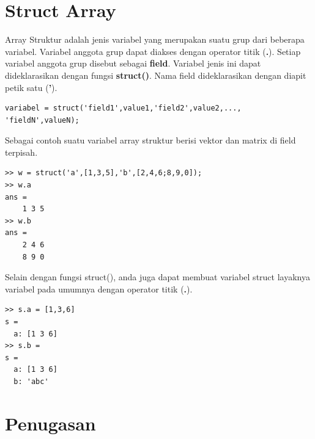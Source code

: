\documentclass[12pt]{book}
\begin{document}
	\section{Struct Array}
	
	Array Struktur adalah jenis variabel yang merupakan suatu grup dari beberapa variabel.
	Variabel anggota grup dapat diakses dengan operator titik (\textbf{.}).
	Setiap variabel anggota grup disebut sebagai \textbf{field}.
	Variabel jenis ini dapat dideklarasikan dengan fungsi \textbf{struct()}.
	Nama field dideklarasikan dengan diapit petik satu (\textbf{'}).
	\begin{verbatim}
variabel = struct('field1',value1,'field2',value2,..., 'fieldN',valueN);
	\end{verbatim}

	Sebagai contoh suatu variabel array struktur berisi vektor dan matrix di field terpisah.
	\begin{verbatim}
>> w = struct('a',[1,3,5],'b',[2,4,6;8,9,0]);
>> w.a
ans =
    1 3 5
>> w.b
ans = 
    2 4 6
    8 9 0
	\end{verbatim}

	\newpage
	Selain dengan fungsi struct(), anda juga dapat membuat variabel struct layaknya variabel pada umumnya dengan operator titik (\textbf{.}).
	\begin{verbatim}
>> s.a = [1,3,6]
s = 
  a: [1 3 6]
>> s.b =
s = 
  a: [1 3 6]
  b: 'abc'
	\end{verbatim}
	 
	\newpage
	\section{Penugasan}
	
\end{document}
